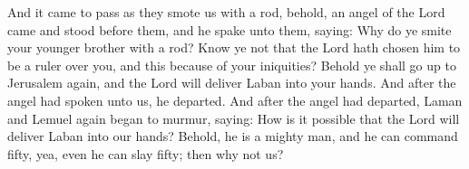 And it came to pass as they smote us with a rod, behold, an angel of the Lord came and stood before them, and he spake unto them, saying: Why do ye smite your younger brother with a rod?  Know ye not that the Lord hath chosen him to be a ruler over you, and this because of your iniquities? Behold ye shall go up to Jerusalem again, and the Lord will deliver Laban into your hands.
\bverse \iffalse And after the angel had spoken unto us, he departed. \fi
And after the angel had spoken unto us, he departed.
\bverse \iffalse And after the angel had departed, Laman and Lemuel again began to murmur, saying: How is it possible that the Lord will deliver Laban into our hands? Behold, he is a mighty man, and he can command fifty, yea, even he can slay fifty; then why not us? \fi
And after the angel had departed, Laman and Lemuel again began to murmur, saying: How is it possible that the Lord will deliver Laban into our hands? Behold, he is a mighty man, and he can command fifty, yea, even he can slay fifty; then why not us?

